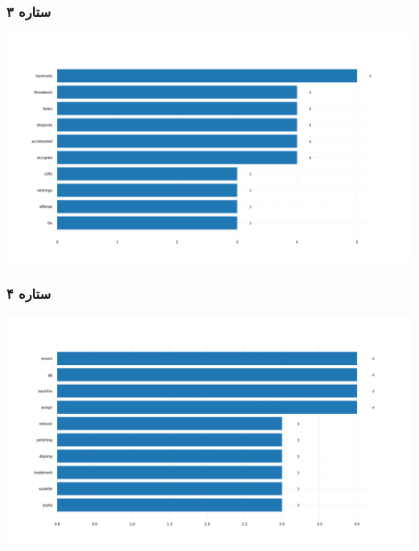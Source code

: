 {{\subsubsection{\Large ۳ ستاره}
{ \setLR
\begin{center}
\includegraphics[scale=0.4]{Images/uncom_words_3star.png}
\end{center}
\begin{adjustbox}{width=\textwidth}
\end{adjustbox}
}
\subsubsection{\Large ۴ ستاره}
{ \setLR
\begin{center}
\includegraphics[scale=0.4]{Images/uncom_words_4star.png}
\end{center}
\begin{adjustbox}{width=\textwidth}
\end{adjustbox}
}
}}
